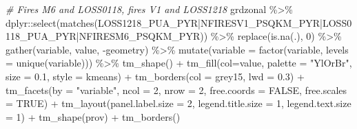 \documentclass[10pt,landscape,a3paper]{article}
\newenvironment{Shaded}{\begin{snugshade}}{\end{snugshade}}
\newcommand{\AttributeTok}[1]{\textcolor[rgb]{0.77,0.63,0.00}{#1}}
\newcommand{\CommentTok}[1]{\textcolor[rgb]{0.56,0.35,0.01}{\textit{#1}}}
\newcommand{\ConstantTok}[1]{\textcolor[rgb]{0.00,0.00,0.00}{#1}}
\newcommand{\DecValTok}[1]{\textcolor[rgb]{0.00,0.00,0.81}{#1}}
\newcommand{\FloatTok}[1]{\textcolor[rgb]{0.00,0.00,0.81}{#1}}
\newcommand{\FunctionTok}[1]{\textcolor[rgb]{0.00,0.00,0.00}{#1}}
\newcommand{\NormalTok}[1]{#1}
\newcommand{\SpecialCharTok}[1]{\textcolor[rgb]{0.00,0.00,0.00}{#1}}
\newcommand{\StringTok}[1]{\textcolor[rgb]{0.31,0.60,0.02}{#1}}
\begin{document}
\begin{Shaded}
\begin{Highlighting}[]

\CommentTok{\# Fires M6 and LOSS0118, fires V1 and LOSS1218}
\NormalTok{grdzonal }\SpecialCharTok{\%\textgreater{}\%}\NormalTok{ dplyr}\SpecialCharTok{::}\FunctionTok{select}\NormalTok{(}\FunctionTok{matches}\NormalTok{(}\StringTok{\textquotesingle{}LOSS1218\_PUA\_PYR|NFIRESV1\_PSQKM\_PYR|LOSS0118\_PUA\_PYR|NFIRESM6\_PSQKM\_PYR\textquotesingle{}}\NormalTok{)) }\SpecialCharTok{\%\textgreater{}\%} 
  \FunctionTok{replace}\NormalTok{(}\FunctionTok{is.na}\NormalTok{(.), }\DecValTok{0}\NormalTok{) }\SpecialCharTok{\%\textgreater{}\%} 
  \FunctionTok{gather}\NormalTok{(variable, value, }\SpecialCharTok{{-}}\NormalTok{geometry) }\SpecialCharTok{\%\textgreater{}\%}
  \FunctionTok{mutate}\NormalTok{(}\AttributeTok{variable =} \FunctionTok{factor}\NormalTok{(variable, }\AttributeTok{levels =} \FunctionTok{unique}\NormalTok{(variable))) }\SpecialCharTok{\%\textgreater{}\%} 
  \FunctionTok{tm\_shape}\NormalTok{() }\SpecialCharTok{+}
  \FunctionTok{tm\_fill}\NormalTok{(}\AttributeTok{col=}\StringTok{\textquotesingle{}value\textquotesingle{}}\NormalTok{, }\AttributeTok{palette =} \StringTok{"YlOrBr"}\NormalTok{, }\AttributeTok{size =} \FloatTok{0.1}\NormalTok{, }\AttributeTok{style =} \StringTok{\textquotesingle{}kmeans\textquotesingle{}}\NormalTok{) }\SpecialCharTok{+}
  \FunctionTok{tm\_borders}\NormalTok{(}\AttributeTok{col =} \StringTok{\textquotesingle{}grey15\textquotesingle{}}\NormalTok{, }\AttributeTok{lwd =} \FloatTok{0.3}\NormalTok{) }\SpecialCharTok{+}
  \FunctionTok{tm\_facets}\NormalTok{(}\AttributeTok{by =} \StringTok{"variable"}\NormalTok{, }\AttributeTok{ncol =} \DecValTok{2}\NormalTok{, }\AttributeTok{nrow =} \DecValTok{2}\NormalTok{, }\AttributeTok{free.coords =} \ConstantTok{FALSE}\NormalTok{, }\AttributeTok{free.scales =} \ConstantTok{TRUE}\NormalTok{) }\SpecialCharTok{+}
  \FunctionTok{tm\_layout}\NormalTok{(}\AttributeTok{panel.label.size =} \DecValTok{2}\NormalTok{, }\AttributeTok{legend.title.size =} \DecValTok{1}\NormalTok{, }\AttributeTok{legend.text.size =} \DecValTok{1}\NormalTok{) }\SpecialCharTok{+}
  \FunctionTok{tm\_shape}\NormalTok{(prov) }\SpecialCharTok{+} \FunctionTok{tm\_borders}\NormalTok{()}
\end{Highlighting}
\end{Shaded}
\end{document}
